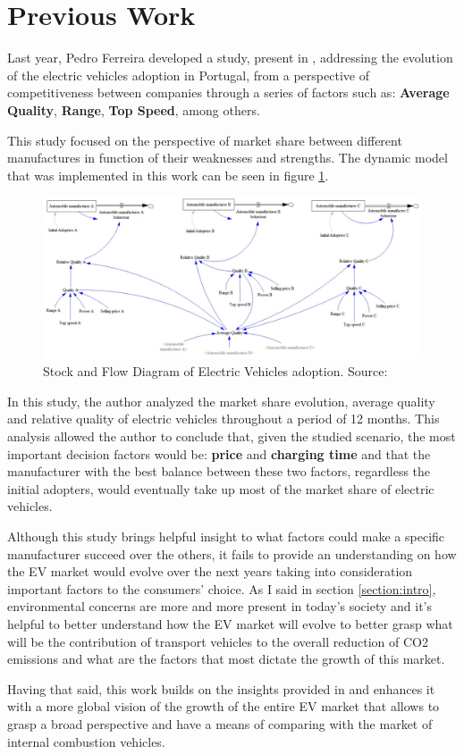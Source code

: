 \section{Previous Work}
Last year, Pedro Ferreira developed a study, present in \cite{pedro-report}, addressing the evolution of the electric vehicles adoption in Portugal, from a perspective of competitiveness between companies through a series of factors such as: \textbf{Average Quality}, \textbf{Range}, \textbf{Top Speed}, among others.

This study focused on the perspective of market share between different manufactures in function of their weaknesses and strengths. The dynamic model that was implemented in this work can be seen in figure \ref{fig:vensim-model-pedro}.

\begin{figure}[htbp]
\centerline{\includegraphics[width=0.9\linewidth]{img/vensim-model-pedro.png}}
\caption{Stock and Flow Diagram of Electric Vehicles adoption. Source: \cite{pedro-report}}
\label{fig:vensim-model-pedro}
\end{figure}

In this study, the author analyzed the market share evolution, average quality and relative quality of electric vehicles throughout a period of 12 months. This analysis allowed the author to conclude that, given the studied scenario, the most important decision factors would be: \textbf{price} and \textbf{charging time} and that the manufacturer with the best balance between these two factors, regardless the initial adopters, would eventually take up most of the market share of electric vehicles.

Although this study brings helpful insight to what factors could make a specific manufacturer succeed over the others, it fails to provide an understanding on how the EV market would evolve over the next years taking into consideration important factors to the consumers' choice. As I said in section \ref{section:intro}, environmental concerns are more and more present in today's society and it's helpful to better understand how the EV market will evolve to better grasp what will be the contribution of transport vehicles to the overall reduction of CO2 emissions and what are the factors that most dictate the growth of this market. 

Having that said, this work builds on the insights provided in \cite{pedro-report} and enhances it with a more global vision of the growth of the entire EV market that allows to grasp a broad perspective and have a means of comparing with the market of internal combustion vehicles.

\clearpage
